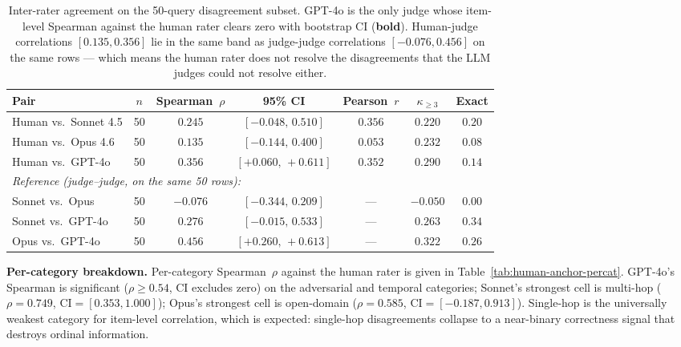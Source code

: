 \documentclass{article}
\begin{document}
\begin{table}[h]
\centering
\small
\begin{tabular}{lcccccc}
\toprule
Pair & $n$ & Spearman~$\rho$ & 95\% CI & Pearson~$r$ & $\kappa_{\geq 3}$ & Exact \\
\midrule
Human vs.\ Sonnet 4.5 & 50 & $0.245$ & $[-0.048,\, 0.510]$ & $0.356$ & $0.220$ & $0.20$ \\
Human vs.\ Opus 4.6   & 50 & $0.135$ & $[-0.144,\, 0.400]$ & $0.053$ & $0.232$ & $0.08$ \\
Human vs.\ GPT-4o     & 50 & $\mathbf{0.356}$ & $\mathbf{[+0.060,\, +0.611]}$ & $0.352$ & $0.290$ & $0.14$ \\
\midrule
\multicolumn{7}{l}{\emph{Reference (judge--judge, on the same 50 rows):}} \\
Sonnet vs.\ Opus      & 50 & $-0.076$ & $[-0.344,\, 0.209]$ & --- & $-0.050$ & $0.00$ \\
Sonnet vs.\ GPT-4o    & 50 & $0.276$ & $[-0.015,\, 0.533]$ & --- & $0.263$ & $0.34$ \\
Opus   vs.\ GPT-4o    & 50 & $0.456$ & $[+0.260,\, +0.613]$ & --- & $0.322$ & $0.26$ \\
\bottomrule
\end{tabular}
\caption{Inter-rater agreement on the 50-query disagreement
subset. GPT-4o is the only judge whose item-level Spearman against
the human rater clears zero with bootstrap CI (\textbf{bold}).
Human-judge correlations $[0.135, 0.356]$ lie in the same band as
judge-judge correlations $[-0.076, 0.456]$ on the same rows --- which
means the human rater does not resolve the disagreements that the
LLM judges could not resolve either.}
\label{tab:human-anchor-agreement}
\end{table}

\textbf{Per-category breakdown.}
Per-category Spearman~$\rho$ against the human rater is given in
Table~\ref{tab:human-anchor-percat}. GPT-4o's Spearman is significant
($\rho \geq 0.54$, CI excludes zero) on the adversarial and temporal
categories; Sonnet's strongest cell is multi-hop ($\rho = 0.749$,
$\text{CI}=[0.353, 1.000]$); Opus's strongest cell is open-domain
($\rho = 0.585$, $\text{CI}=[-0.187, 0.913]$). Single-hop is the
universally weakest category for item-level correlation, which is
expected: single-hop disagreements collapse to a near-binary
correctness signal that destroys ordinal information.
\end{document}
